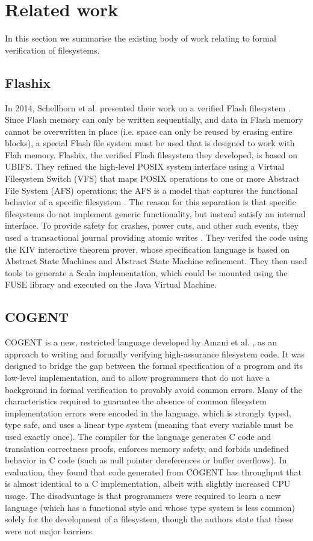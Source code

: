 \section{Related work}
In this section we summarise the existing body of work relating to formal verification of filesystems.

\subsection{Flashix}
In 2014, Schellhorn et al. presented their work on a verified Flash filesystem \cite{schellhorn2014}.
Since Flash memory can only be written sequentially, and data in Flash memory cannot be overwritten in place (i.e. space can only be reused by erasing entire blocks), a special Flash file system must be used that is designed to work with Flah memory.
Flashix, the verified Flash filesystem they developed, is based on UBIFS.
They refined the high-level POSIX system interface using a Virtual Filesystem Switch (VFS) that maps POSIX operations to one or more Abstract File System (AFS) operations; the AFS is a model that captures the functional behavior of a specific filesystem \cite{ernst2012}.
The reason for this separation is that specific filesystems do not implement generic functionality, but instead satisfy an internal interface.
To provide safety for crashes, power cuts, and other such events, they used a transactional journal providing atomic writes \cite{ernst2015}.
They verifed the code using the KIV interactive theorem prover, whose specification language is based on Abstract State Machines and Abstract State Machine refinement.
They then used tools to generate a Scala implementation, which could be mounted using the FUSE library and executed on the Java Virtual Machine.

\subsection{COGENT}
COGENT is a new, restricted language developed by Amani et al. \cite{amani2016}, as an approach to writing and formally verifying high-assurance filesystem code.
It was designed to bridge the gap between the formal specification of a program and its low-level implementation, and to allow programmers that do not have a background in formal verification to provably avoid common errors.
Many of the characteristics required to guarantee the absence of common filesystem implementation errors were encoded in the language, which is strongly typed, type safe, and uses a linear type system (meaning that every variable must be used exactly once).
The compiler for the language generates C code and translation correctness proofs, enforces memory safety, and forbids undefined behavior in C code (such as null pointer dereferences or buffer overflows).
In evaluation, they found that code generated from COGENT has throughput that is almost identical to a C implementation, albeit with slightly increased CPU usage.
The disadvantage is that programmers were required to learn a new language (which has a functional style and whose type system is less common) solely for the development of a filesystem, though the authors state that these were not major barriers.

